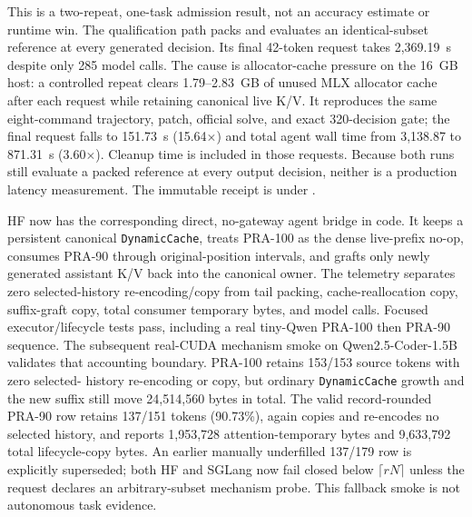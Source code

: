 \documentclass[11pt]{article}
\begin{document}
This is a two-repeat, one-task admission result, not an accuracy estimate or
runtime win.
The qualification path packs and evaluates an identical-subset reference at
every generated decision.  Its final 42-token request takes 2,369.19~s despite
only 285 model calls.  The cause is allocator-cache pressure on the 16~GB host:
a controlled repeat clears 1.79--2.83~GB of unused MLX allocator cache after
each request while retaining canonical live K/V.  It reproduces the same
eight-command trajectory, patch, official solve, and exact 320-decision gate;
the final request falls to 151.73~s (15.64$\times$) and total agent wall time
from 3,138.87 to 871.31~s (3.60$\times$).  Cleanup time is included in those
requests.  Because both runs still evaluate a packed reference at every output
decision, neither is a production latency measurement.  The immutable receipt
is under
.

HF now has the corresponding direct, no-gateway agent bridge in code.  It keeps
a persistent canonical \texttt{DynamicCache}, treats PRA-100 as the dense
live-prefix no-op, consumes PRA-90 through original-position intervals, and
grafts only newly generated assistant K/V back into the canonical owner.  The
telemetry separates zero selected-history re-encoding/copy from tail packing,
cache-reallocation copy, suffix-graft copy, total consumer temporary bytes, and
model calls.  Focused executor/lifecycle tests pass, including a real tiny-Qwen
PRA-100 then PRA-90 sequence.
The subsequent real-CUDA mechanism smoke on Qwen2.5-Coder-1.5B validates that
accounting boundary.  PRA-100 retains 153/153 source tokens with zero selected-
history re-encoding or copy, but ordinary \texttt{DynamicCache} growth and the
new suffix still move 24,514,560 bytes in total.  The valid record-rounded
PRA-90 row retains 137/151 tokens (90.73\%), again copies and re-encodes no
selected history, and reports 1,953,728 attention-temporary bytes and
9,633,792 total lifecycle-copy bytes.  An earlier manually underfilled
137/179 row is explicitly superseded; both HF and SGLang now fail closed below
$\lceil rN\rceil$ unless the request declares an arbitrary-subset mechanism
probe.  This fallback smoke is not autonomous task evidence.
\end{document}
